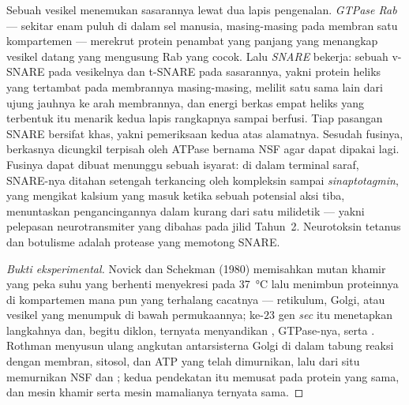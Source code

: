 \begin{definition}\label{def:b3:membrane-traffic:fusion}
Sebuah vesikel menemukan sasarannya lewat dua lapis pengenalan. \emph{GTPase
Rab} --- sekitar enam puluh di dalam sel manusia, masing-masing pada membran
satu kompartemen --- merekrut protein penambat yang panjang yang menangkap
vesikel datang yang mengusung Rab yang cocok. Lalu \emph{SNARE} bekerja: sebuah
v-SNARE pada vesikelnya dan t-SNARE pada sasarannya, yakni protein heliks yang
tertambat pada membrannya masing-masing, melilit satu sama lain dari ujung
jauhnya ke arah membrannya, dan energi berkas empat heliks yang terbentuk itu
menarik kedua lapis rangkapnya sampai berfusi. Tiap pasangan SNARE bersifat
khas, yakni pemeriksaan kedua atas alamatnya. Sesudah fusinya, berkasnya
dicungkil terpisah oleh ATPase bernama NSF agar dapat dipakai lagi. Fusinya
dapat dibuat menunggu sebuah isyarat: di dalam terminal saraf, SNARE-nya
ditahan setengah terkancing oleh kompleksin sampai \emph{sinaptotagmin}, yang
mengikat kalsium yang masuk ketika sebuah potensial aksi tiba, menuntaskan
pengancingannya dalam kurang dari satu milidetik --- yakni pelepasan
neurotransmiter yang dibahas pada jilid Tahun~2. Neurotoksin tetanus dan
botulisme adalah protease yang memotong SNARE.
\end{definition}

\begin{proof}[Bukti eksperimental]
Novick dan Schekman (1980) memisahkan mutan khamir yang peka suhu
yang berhenti menyekresi pada \qty{37}{\celsius} lalu menimbun
proteinnya di kompartemen mana pun yang terhalang cacatnya --- retikulum,
Golgi, atau vesikel yang menumpuk di bawah permukaannya; ke-$23$ gen \emph{sec}
itu menetapkan langkahnya dan, begitu diklon, ternyata menyandikan ,
GTPase-nya, serta . Rothman menyusun ulang angkutan antarsisterna
Golgi di dalam tabung reaksi dengan membran, sitosol, dan ATP yang telah
dimurnikan, lalu dari situ memurnikan NSF dan ; kedua pendekatan itu
memusat pada protein yang sama, dan mesin khamir serta mesin mamalianya
ternyata sama.
\end{proof}

